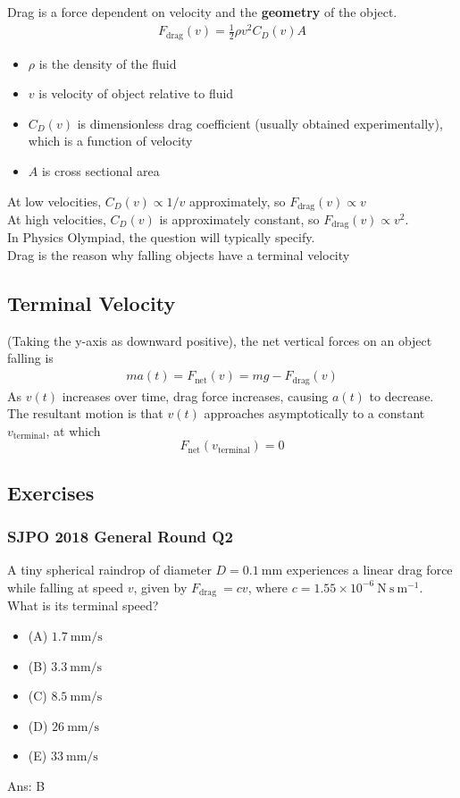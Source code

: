 \documentclass{article}
\begin{document}
Drag is a force dependent on velocity and the \textbf{geometry} of the object.
\begin{align}
    F_{\text{drag}}(v) =\frac{1}{2} \rho v^2 C_D(v) A
\end{align}
\begin{itemize}
    \item $\rho$ is the density of the fluid
    \item $v$ is velocity of object relative to fluid
    \item $C_D(v)$ is dimensionless drag coefficient (usually obtained experimentally), which is a function of velocity
    \item $A$ is cross sectional area
\end{itemize}
At low velocities, $C_D(v) \propto 1/v$ approximately, so $F_{\text{drag}}(v) \propto v$ \\[10pt]
At high velocities, $C_D(v)$ is approximately constant, so $F_{\text{drag}}(v) \propto v^2$. \\[10pt]
In Physics Olympiad, the question will typically specify. \\[10pt]
Drag is the reason why falling objects have a terminal velocity
\subsection{Terminal Velocity}
(Taking the y-axis as downward positive), the net vertical forces on an object falling is
\begin{align}
    ma(t) = F_{\text{net}}(v) = mg - F_{\text{drag}}(v)
\end{align}
As $v(t)$ increases over time, drag force increases, causing $a(t)$ to decrease. The resultant motion is that $v(t)$ approaches asymptotically to a constant $v_{\text{terminal}}$, at which $$F_{\text{net}}(v_{\text{terminal}}) = 0$$

\subsection{Exercises}
\subsubsection{SJPO 2018 General Round Q2}
A tiny spherical raindrop of diameter $D=0.1 \mathrm{~mm}$ experiences a linear drag force while falling at speed $v$, given by $F_{\text {drag }}=c v$, where $c=1.55 \times 10^{-6} \mathrm{~N} \mathrm{~s} \mathrm{~m}^{-1}$. What is its terminal speed?
\begin{itemize}
\item[] (A) $1.7 \mathrm{~mm} / \mathrm{s}$
\item[] (B) $3.3 \mathrm{~mm} / \mathrm{s}$
\item[] (C) $8.5 \mathrm{~mm} / \mathrm{s}$
\item[] (D) $26 \mathrm{~mm} / \mathrm{s}$
\item[] (E) $33 \mathrm{~mm} / \mathrm{s}$
\end{itemize}
Ans: \ifpaper B \fi
\end{document}
